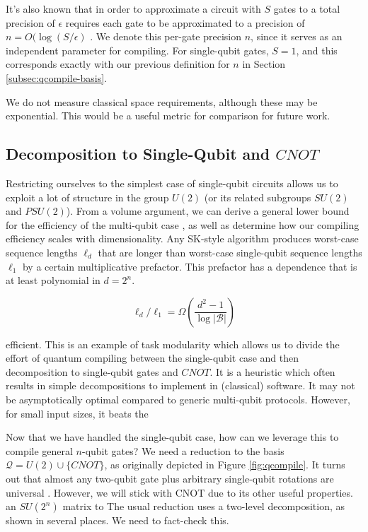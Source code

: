 It's also known that
in order to approximate a circuit with $S$ gates to a total precision of
$\epsilon$
requires each gate to be approximated to a precision of
$n = O(\log(S/\epsilon)$ \cite{Lloyd1995}. We denote this per-gate precision
$n$, since it serves as an independent parameter for compiling. For
single-qubit gates, $S = 1$, and this corresponds exactly with our previous
definition for $n$ in Section \ref{subsec:qcompile-basis}.

We do not measure classical space requirements, although these may be
exponential. This would be a useful metric for comparison for future work.

\subsection{Decomposition to Single-Qubit and $CNOT$}
\label{subsec:qcompile-multi}

Restricting ourselves to the simplest case of
single-qubit circuits allows us to exploit a lot of structure
in the group $U(2)$ (or its related subgroups $SU(2)$ and $PSU(2)$).
From a volume argument, we can derive a general
lower bound for the efficiency of the multi-qubit case \cite{Harrow2003},
as well as determine how our compiling efficiency scales with dimensionality.
Any
SK-style algorithm produces worst-case sequence lengths $\ell_d$ that
are longer than worst-case single-qubit sequence lengths $\ell_1$ by a certain multiplicative
prefactor. This prefactor has a dependence that is at least
polynomial in $d = 2^n$. 

\begin{equation}
\ell_d / \ell_1 = \Omega \left( \frac{d^2 - 1}{ \log |\mathcal{B}| } \right )
\end{equation}

efficient. This is an example of task modularity which allows us
to divide the effort of quantum compiling between the
single-qubit case and then decomposition to single-qubit gates and
$CNOT$. It is a heuristic which often results
in simple decompositions to implement in (classical) software.
It may not be asymptotically optimal compared to generic 
multi-qubit protocols. However, for small input sizes, it beats the




Now that we have handled the single-qubit case, how can we leverage this
to compile general $n$-qubit gates? We need a reduction to the basis
$\mathcal{Q} = U(2) \cup \{ CNOT \}$, as originally depicted in
Figure \ref{fig:qcompile}.
It turns out that almost any two-qubit gate plus arbitrary single-qubit
rotations are universal \cite{Bremner2002}. However, we will stick with CNOT
due to its other useful properties.
an $SU(2^n)$ matrix to 
The usual reduction uses
a two-level decomposition, as shown in several places.
We need to fact-check this.
\cite{Kitaev2002}


